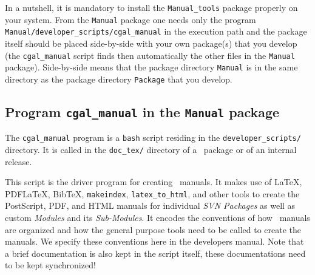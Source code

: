 In a nutshell, it is mandatory to install the \texttt{Manual\_tools}
package properly on your system. From the \texttt{Manual} package one
needs only the program \texttt{Manual/developer\_scripts/cgal\_manual}
in the execution path and the package itself should be placed
side-by-side with your own package(s) that you develop (the
\texttt{cgal\_manual} script finds then automatically the other files
in the \texttt{Manual} package). Side-by-side means that the package
directory \texttt{Manual} is in the same directory as the package
directory \texttt{Package} that you develop.


\subsection{Program \texttt{cgal\_manual} in the \texttt{Manual} package}
\label{subsec:cgal_manual_program}

The \texttt{cgal\_manual} program is a \texttt{bash} script residing
in the \texttt{developer\_scripts/} directory. It is called in the
\texttt{doc\_tex/} directory of a \cgal\ package or of an internal
release.

This script is the driver program for creating \cgal\ manuals.  It
makes use of \LaTeX, PDF\LaTeX, Bib\TeX, \texttt{makeindex},
\texttt{latex\_to\_html}, and other tools to create the PostScript,
PDF, and HTML manuals for individual \emph{SVN Packages} as well as
custom \emph{Modules} and its \emph{Sub-Modules}. It encodes the conventions
of how \cgal\ manuals are organized and how the general purpose tools need
to be called to create the manuals. We specify these conventions here in the
developers manual. Note that a brief documentation is also kept in the
script itself, these documentations need to be kept synchronized!

